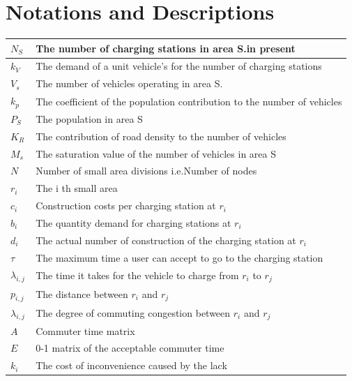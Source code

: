 \documentclass{mcmthesis}
\begin{document}
\section{Notations and Descriptions}
	\begin{tabular}{l|l}
		\hline
		$N_S$  & 
		The number of charging stations in area S.in present \bigstrut\\
		\hline
		$k_V$  & The demand of a unit vehicle's for the number of charging stations \bigstrut\\
		\hline
		$V_s$  & The number of vehicles operating in area S. \bigstrut\\
		\hline
		$k_p$  & The coefficient of the population contribution to the number of vehicles \bigstrut\\
		\hline
		$P_S$  & The population in area S \bigstrut\\
		\hline
		$K_R$  & The contribution of road density to the number of vehicles \bigstrut\\
		\hline
		$M_s$  & The saturation value of the number of vehicles in area S \bigstrut\\
		\hline
		$N$     & Number of small area divisions i.e.Number of nodes \bigstrut\\
		\hline
		$r_i$   & The i th small area \bigstrut\\
		\hline
		$c_i$  & Construction costs per charging station at $r_i$ \bigstrut\\
		\hline
		$b_i$  & The quantity demand for charging stations at $r_i$ \bigstrut\\
		\hline
		$d_i$  & The actual number of construction of the charging station at $r_i$ \bigstrut\\
		\hline
		$\tau$     & The maximum time a user can accept to go to the charging station \bigstrut\\
		\hline
		$\lambda_{i,j}$ & The time it takes for the vehicle to charge from $r_i$ to $r_j$ \bigstrut\\
		\hline
		$p_{i,j}$ & The distance between $r_i$ and $r_j$ \bigstrut\\
		\hline
		$λ_{i,j}$ & The degree of commuting congestion between $r_i$ and $r_j$ \bigstrut\\
		\hline
		$A$     & Commuter time matrix \bigstrut\\
		\hline
		$E$     & 0-1 matrix of the acceptable commuter time \bigstrut\\
		\hline
		$k_i$  & The cost of inconvenience caused by the lack 

\end{tabular}
\end{document}
